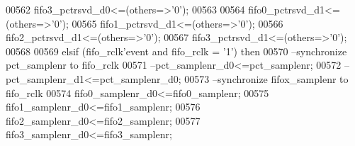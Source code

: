 \begin{DoxyCode}
00562             \textcolor{vhdlchar}{fifo3_pctrsvd_d0}\textcolor{vhdlchar}{<=}\textcolor{vhdlchar}{(}\textcolor{keywordflow}{others}\textcolor{vhdlchar}{=}\textcolor{vhdlchar}{>}\textcolor{vhdlchar}{'}\textcolor{vhdllogic}{}\textcolor{vhdllogic}{0}\textcolor{vhdlchar}{'}\textcolor{vhdlchar}{)};
00563             
00564             \textcolor{vhdlchar}{fifo0_pctrsvd_d1}\textcolor{vhdlchar}{<=}\textcolor{vhdlchar}{(}\textcolor{keywordflow}{others}\textcolor{vhdlchar}{=}\textcolor{vhdlchar}{>}\textcolor{vhdlchar}{'}\textcolor{vhdllogic}{}\textcolor{vhdllogic}{0}\textcolor{vhdlchar}{'}\textcolor{vhdlchar}{)};
00565             \textcolor{vhdlchar}{fifo1_pctrsvd_d1}\textcolor{vhdlchar}{<=}\textcolor{vhdlchar}{(}\textcolor{keywordflow}{others}\textcolor{vhdlchar}{=}\textcolor{vhdlchar}{>}\textcolor{vhdlchar}{'}\textcolor{vhdllogic}{}\textcolor{vhdllogic}{0}\textcolor{vhdlchar}{'}\textcolor{vhdlchar}{)};
00566             \textcolor{vhdlchar}{fifo2_pctrsvd_d1}\textcolor{vhdlchar}{<=}\textcolor{vhdlchar}{(}\textcolor{keywordflow}{others}\textcolor{vhdlchar}{=}\textcolor{vhdlchar}{>}\textcolor{vhdlchar}{'}\textcolor{vhdllogic}{}\textcolor{vhdllogic}{0}\textcolor{vhdlchar}{'}\textcolor{vhdlchar}{)};
00567             \textcolor{vhdlchar}{fifo3_pctrsvd_d1}\textcolor{vhdlchar}{<=}\textcolor{vhdlchar}{(}\textcolor{keywordflow}{others}\textcolor{vhdlchar}{=}\textcolor{vhdlchar}{>}\textcolor{vhdlchar}{'}\textcolor{vhdllogic}{}\textcolor{vhdllogic}{0}\textcolor{vhdlchar}{'}\textcolor{vhdlchar}{)};
00568             
00569         \textcolor{keywordflow}{elsif} \textcolor{vhdlchar}{(}\textcolor{vhdlchar}{fifo_rclk}\textcolor{vhdlchar}{'}\textcolor{vhdlkeyword}{event} \textcolor{keywordflow}{and} \textcolor{vhdlchar}{fifo_rclk} \textcolor{vhdlchar}{=} \textcolor{vhdlchar}{'}\textcolor{vhdllogic}{}\textcolor{vhdllogic}{1}\textcolor{vhdlchar}{'}\textcolor{vhdlchar}{)} \textcolor{keywordflow}{then}
00570 \textcolor{keyword}{            --synchronize pct\_samplenr to fifo\_rclk}
00571 \textcolor{keyword}{           --pct\_samplenr\_d0<=pct\_samplenr;}
00572 \textcolor{keyword}{            --pct\_samplenr\_d1<=pct\_samplenr\_d0;}
00573 \textcolor{keyword}{            --synchronize fifox\_samplenr to fifo\_rclk}
00574             \textcolor{vhdlchar}{fifo0_samplenr_d0}\textcolor{vhdlchar}{<=}\textcolor{vhdlchar}{fifo0_samplenr};
00575             \textcolor{vhdlchar}{fifo1_samplenr_d0}\textcolor{vhdlchar}{<=}\textcolor{vhdlchar}{fifo1_samplenr};
00576             \textcolor{vhdlchar}{fifo2_samplenr_d0}\textcolor{vhdlchar}{<=}\textcolor{vhdlchar}{fifo2_samplenr};
00577             \textcolor{vhdlchar}{fifo3_samplenr_d0}\textcolor{vhdlchar}{<=}\textcolor{vhdlchar}{fifo3_samplenr};

\end{DoxyCode}
